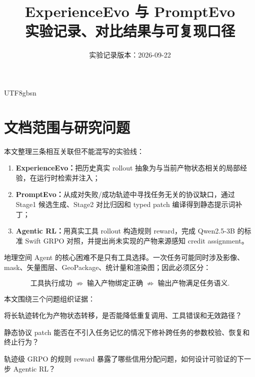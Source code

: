 \documentclass[a4paper,11pt]{article}
\title{\textbf{ExperienceEvo 与 PromptEvo}\\实验记录、对比结果与可复现口径}
\author{实验记录版本：2026-09-22}
\date{}
\begin{document}
\begin{CJK*}{UTF8}{gbsn}
\maketitle

\begin{center}
\end{center}

\tableofcontents

\section{文档范围与研究问题}

本文整理三条相互关联但不能混写的实验线：

\begin{enumerate}
  \item \textbf{ExperienceEvo：}把历史真实 rollout 抽象为与当前产物状态相关的局部经验，在运行时检索并注入；
  \item \textbf{PromptEvo：}从成对失败/成功轨迹中寻找任务无关的协议缺口，通过 Stage1 候选生成、Stage2 对比归因和 typed patch 编译得到静态提示词补丁；
  \item \textbf{Agentic RL：}用真实工具 rollout 构造规则 reward，完成 Qwen2.5-3B 的标准 Swift GRPO 对照，并提出尚未实现的产物来源感知 credit assignment。
\end{enumerate}

地理空间 Agent 的核心困难不是只有工具选择。一次任务可能同时涉及影像、mask、矢量图层、GeoPackage、统计量和渲染图；因此必须区分：

\begin{equation}
\text{工具执行成功}
\;\not\Rightarrow\;
\text{输入产物绑定正确}
\;\not\Rightarrow\;
\text{输出产物满足任务语义}.
\end{equation}

本文围绕三个问题组织证据：

\begin{description}[leftmargin=4em,labelwidth=2.5em,labelsep=0.5em]
  \item[RQ1] 将长轨迹转化为产物状态转移，是否能降低重复调用、工具错误和无效路径？
  \item[RQ2] 静态协议 patch 能否在不引入任务记忆的情况下修补跨任务的参数校验、恢复和终止行为？
  \item[RQ3] 轨迹级 GRPO 的规则 reward 暴露了哪些信用分配问题，如何设计可验证的下一步 Agentic RL？
\end{description}


\end{CJK*}
\end{document}
